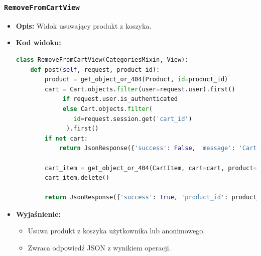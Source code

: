 \documentclass[12pt,a4paper,oneside]{article}
\theoremstyle{definition}
\numberwithin{equation}{section}
\begin{document}
\subsubsection*{\texttt{RemoveFromCartView}}
\begin{itemize}
    \item \textbf{Opis:} Widok usuwający produkt z koszyka.
    \item \textbf{Kod widoku:}
\begin{lstlisting}[language=Python, caption=\texttt{RemoveFromCartView}]
class RemoveFromCartView(CategoriesMixin, View):
    def post(self, request, product_id):
        product = get_object_or_404(Product, id=product_id)
        cart = Cart.objects.filter(user=request.user).first()
             if request.user.is_authenticated 
             else Cart.objects.filter(
                id=request.session.get('cart_id')
              ).first()
        if not cart:
            return JsonResponse({'success': False, 'message': 'Cart not found'})

        cart_item = get_object_or_404(CartItem, cart=cart, product=product)
        cart_item.delete()

        return JsonResponse({'success': True, 'product_id': product_id})
\end{lstlisting}

    \item \textbf{Wyjaśnienie:}
    \begin{itemize}
        \item Usuwa produkt z koszyka użytkownika lub anonimowego.
        \item Zwraca odpowiedź JSON z wynikiem operacji.
    \end{itemize}
\end{itemize}
\end{document}
